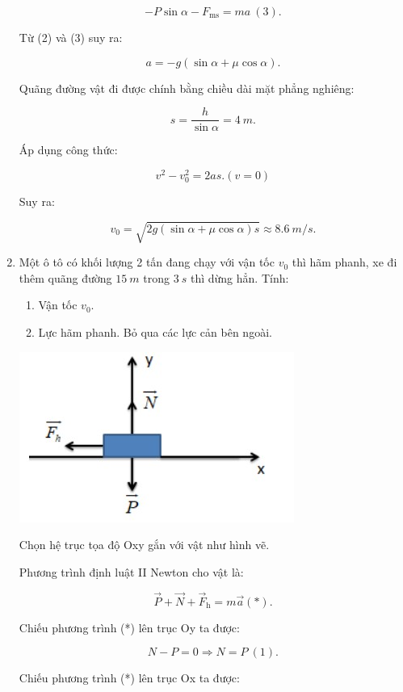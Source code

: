 \begin{enumerate}[label=\bfseries Câu \arabic*:]
{		$$ - P \sin \alpha - F_\text{ms} = ma\ (3).$$
		
		Từ (2) và (3) suy ra:
		
		$$a = -g(\sin \alpha + \mu \cos \alpha).$$
		
		Quãng đường vật đi được chính bằng chiều dài mặt phẳng nghiêng:
		
		$$s = \dfrac{h}{\sin \alpha } = \SI{4}{m}.$$
		
		Áp dụng công thức:
		
		$$v^2 - v_0^2 = 2as. (v=0)$$ 
		
		Suy ra:
		
		$$v_0 = \sqrt{2g(\sin \alpha + \mu \cos \alpha)s} \approx \SI{8,6}{m/s}.$$
	}
	\item {}
	
	
	{
	Một ô tô có khối lượng 2 tấn đang chạy với vận tốc $v_0$ thì hãm phanh, xe đi thêm quãng đường $\SI{15}{m}$ trong $\SI{3}{s}$ thì dừng hẳn. Tính:
	\begin{enumerate}[label=\alph*)]
		\item Vận tốc $v_0$.
		\item Lực hãm phanh. Bỏ qua các lực cản bên ngoài.
	\end{enumerate}
	}
	
	\hideall
	{
		\begin{center}
			\includegraphics[scale=1]{../figs/VN10-2022-PH-TP021-11.jpg}
		\end{center}
	
		Chọn hệ trục tọa độ Oxy gắn với vật như hình vẽ.
		
		Phương trình định luật II Newton cho vật là:
		
		$$\vec P + \vec N + \vec F_\text{h} = m\vec a (*).$$
		
		Chiếu phương trình (*) lên trục Oy ta được:
		
		$$N - P = 0 \Rightarrow N = P\ (1).$$
		
		Chiếu phương trình (*) lên trục Ox ta được:
		
}
\end{enumerate}
